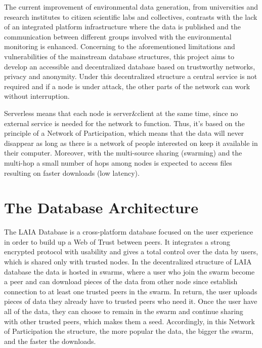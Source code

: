 \documentclass[conference,final,]{IEEEtran}
\begin{document}
The current improvement of environmental data generation, from
universities and research institutes to citizen scientific labs and
collectives, contrasts with the lack of an integrated platform
infrastructure where the data is published and the communication between
different groups involved with the environmental monitoring is enhanced.
Concerning to the aforementioned limitations and vulnerabilities of the
mainstream database structures, this project aims to develop an
accessible and decentralized database based on trustworthy networks,
privacy and anonymity. Under this decentralized structure a central
service is not required and if a node is under attack, the other parts
of the network can work without interruption.

Serverless means that each node is server\&client at the same time,
since no external service is needed for the network to function. Thus,
it's based on the principle of a Network of Participation, which means
that the data will never disappear as long as there is a network of
people interested on keep it available in their computer. Moreover, with
the multi-source sharing (swarming) and the multi-hop a small number of
hops among nodes is expected to access files resulting on faster
downloads (low latency).

\hypertarget{the-database-architecture}{%
\section{The Database Architecture}\label{the-database-architecture}}

The LAIA Database is a cross-platform database focused on the user
experience in order to build up a Web of Trust between peers. It
integrates a strong encrypted protocol with usability and gives a total
control over the data by users, which is shared only with trusted nodes.
In the decentralized structure of LAIA database the data is hosted in
swarms, where a user who join the swarm become a peer and can download
pieces of the data from other node since establish connection to at
least one trusted peers in the swarm. In return, the user uploads pieces
of data they already have to trusted peers who need it. Once the user
have all of the data, they can choose to remain in the swarm and
continue sharing with other trusted peers, which makes them a seed.
Accordingly, in this Network of Participation the structure, the more
popular the data, the bigger the swarm, and the faster the downloads.
\end{document}
